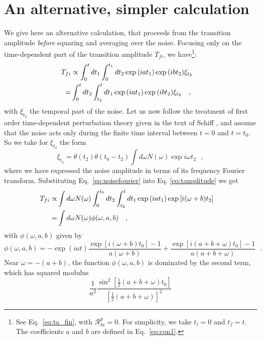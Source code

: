 \documentclass[12pt,onecolumn,amssymb,nofootinbib]{revtex4-2} %
\begin{document}
\section{An alternative, simpler calculation}

We give here an alternative calculation, that proceeds from the transition amplitude {\it before} squaring and
averaging over the noise. Focusing only on the time-dependent part of the transition amplitude $T_{fi}$, we have\footnote{See Eq.~\eqref{eq:ta_fin}, with ${\mathcal R}_{ki}^{p} = 0$. For simplicity, we take $t_i = 0$ and $t_f = t$. The coefficients $a$ and $b$ are defined in Eq.~\eqref{eq:con1}.}:
\begin{align}\label{eq:tamplitude}
T_{fi} &\propto \int_0^{t}dt_1 \int_0^{t_1} dt_2 \exp{(iat_1)} \exp{(ibt_2)} \xi_{t_2}\cr
=& \int_0^t dt_2 \int_{t_2}^t dt_1  \exp{(iat_1)} \exp{(ibt_2)} \xi_{t_2}~~~,\cr
\end{align}
with $\xi_{t_2}$ the temporal part of the noise.
Let us now
follow the treatment of first order time-dependent perturbation theory given in the text of Schiff \cite{ref:schiff}, and
assume that the noise acts only during the finite time interval between $t=0$ and $t=t_0$.  So we take for
$\xi_{t_2}$ the form
\begin{equation}\label{eq:noisefourier}
\xi_{t_2}=\theta(t_2)\theta(t_0-t_2) \int d\omega  N(\omega) \exp{i\omega t_2} ~~~,
\end{equation}
where we have expressed the noise amplitude in terms of its frequency Fourier transform.
Substituting Eq.~\eqref{eq:noisefourier} into Eq. \eqref{eq:tamplitude} we get
\begin{align}\label{eq:tcalculation}
T_{fi} \propto& \int d\omega N(\omega) \int_0^{t_0} dt_2 \int_{t_2}^t dt_1  \exp{(iat_1)} \exp{[i(\omega+b)t_2]} \cr
=& \int d\omega N(\omega) \phi(\omega,a,b)~~~,\cr
\end{align}
with $\phi(\omega,a,b)$ given by
\begin{equation}\label{eq:phidef}
\phi(\omega,a,b)= -\exp{(iat)} \frac{\exp{[i(\omega+b) t_0]}-1}{a(\omega +b)}
+\frac{\exp{[i(a+b+\omega) t_0]} -1}{a(a+b+\omega)}~~~.
\end{equation}
Near $\omega=-(a+b)$, the function $\phi(\omega,a,b)$ is dominated by the second term,
which has squared modulus
\begin{equation}\label{eq:secondterm}
\frac{1}{a^2} \frac{\sin^2{[\frac{1}{2}(a+b+\omega)t_0]} } {[\frac{1}{2}(a+b+\omega)]^2}
\end{equation}
\end{document}
